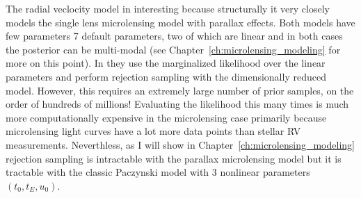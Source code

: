 \documentclass[12pt,dvipsnames]{report}
\begin{document}
The radial veclocity model in \citet{2017ApJ...837...20P} interesting because
structurally it very closely models the single lens microlensing model with
parallax effects. Both models have few parameters 7 default parameters, two of
which are linear and in both cases the posterior can be multi-modal (see
Chapter~\ref{ch:microlensing_modeling} for more on this point). In
\citet{2017ApJ...837...20P} they use the marginalized likelihood over the
linear parameters and perform rejection sampling with the dimensionally reduced
model. However, this requires an extremely large number of prior samples, on
the order of hundreds of millions! Evaluating the likelihood this many times is
much more computationally expensive in the microlensing case primarily because
microlensing light curves have a lot more data points than stellar RV
measurements. Neverthless, as I will show in Chapter~\ref{ch:microlensing_modeling}
rejection sampling is intractable with the parallax microlensing model but it
is tractable with the classic Paczynski model with 3 nonlinear parameters
$(t_0, t_E, u_0)$.
\end{document}
